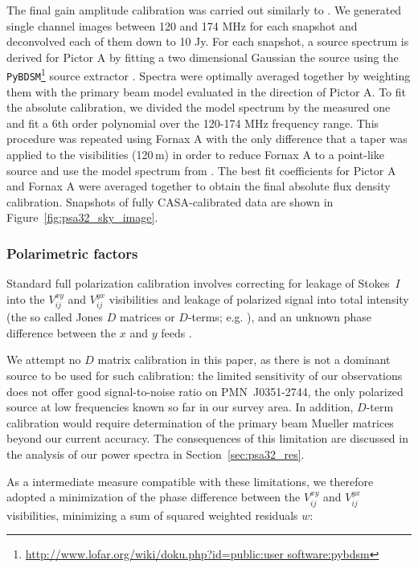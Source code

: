 The final gain amplitude calibration was carried out similarly to \citet{Ali.15}. We generated single channel images between 120 and 174 MHz for each snapshot and deconvolved each of them down to 10 Jy. For each snapshot, a source spectrum is derived for Pictor A by fitting a two dimensional Gaussian the source using the {\tt PyBDSM}\footnote{\url{http://www.lofar.org/wiki/doku.php?id=public:user software:pybdsm}} source extractor \citep{pybdsm}. Spectra were optimally averaged together by weighting them with the primary beam model evaluated in the direction of Pictor A. To fit the absolute calibration, we divided the model spectrum \citep{Jacobs.13} by the measured one and fit a 6th order polynomial over the 120-174 MHz frequency range. This procedure was repeated using Fornax A with the only difference that a taper was applied to the visibilities (120\,m) in order to reduce Fornax A to a point-like source and use the model spectrum from \citet{Bernardi.13}. The best fit coefficients for Pictor A and Fornax A were averaged together to obtain the final absolute flux density calibration. Snapshots of fully CASA-calibrated data are shown in Figure~\ref{fig:psa32_sky_image}.

\subsubsection{Polarimetric factors}
\label{subsubsec:psa32_polcal}
Standard full polarization calibration involves correcting for leakage of Stokes~$I$ into the $V_{ij}^{xy}$ and $V_{ij}^{yx}$ visibilities and leakage of polarized signal into total intensity (the so called Jones $D$ matrices or $D$-terms; e.g. \citet[][]{TMS, HBS.1.96}), and an unknown phase difference between the $x$ and $y$ feeds \citep[e.g.][]{Sault.96}. 

We attempt no $D$ matrix calibration in this paper, as there is not a dominant source to be used for such calibration: the limited sensitivity of our observations does not offer good signal-to-noise ratio on PMN~J0351-2744, the only  polarized source at low frequencies known so far in our survey area.  In addition, $D$-term calibration would require determination of the primary beam Mueller matrices beyond our current accuracy. The consequences of this limitation are discussed in the analysis of our power spectra in Section~\ref{sec:psa32_res}.  

As a intermediate measure compatible with these limitations, we therefore adopted a minimization of the phase difference between the $V_{ij}^{xy}$ and $V_{ij}^{yx}$ visibilities, minimizing a sum of squared weighted residuals $w$:


